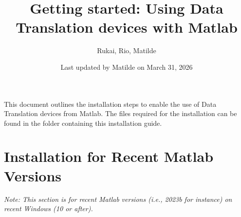 \documentclass{article}
\begin{document}
    \title{Getting started: Using Data Translation devices with Matlab}
    \author{Rukai, Rio, Matilde}
    \date{Last updated by Matilde on March 31, 2026}
    \maketitle
    
    This document outlines the installation steps to enable the use of Data Translation devices from Matlab. The files required for the installation can be found in the folder containing this installation guide.

    \section{Installation for Recent Matlab Versions}
    \textit{Note: This section is for recent Matlab versions (i.e., 2023b for instance) on recent Windows (10 or after).}
\end{document}
